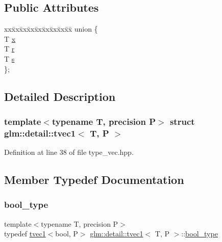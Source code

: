 \subsection*{Public Attributes}
\begin{DoxyCompactItemize}
\item 
\begin{tabbing}
xx\=xx\=xx\=xx\=xx\=xx\=xx\=xx\=xx\=\kill
union \{\\
\>T \hyperlink{structglm_1_1detail_1_1tvec1_a6d6f02bf4a9d0129762489169fc2f9dc}{x}\\
\>T \hyperlink{structglm_1_1detail_1_1tvec1_a23dd665bc4be83544c436a88fdcea088}{r}\\
\>T \hyperlink{structglm_1_1detail_1_1tvec1_a1025b03a3e1f99c7a42518af40737d7b}{s}\\
\}; \\

\end{tabbing}\end{DoxyCompactItemize}


\subsection{Detailed Description}
\subsubsection*{template$<$typename T, precision P$>$\newline
struct glm\+::detail\+::tvec1$<$ T, P $>$}



Definition at line 38 of file type\+\_\+vec.\+hpp.



\subsection{Member Typedef Documentation}
\mbox{\label{structglm_1_1detail_1_1tvec1_a9d5cbfb22c5b204382bede6efb1e96a2}} 
\subsubsection{\texorpdfstring{bool\+\_\+type}{bool\_type}}
{\footnotesize\ttfamily template$<$typename T, precision P$>$ \\
typedef \hyperlink{structglm_1_1detail_1_1tvec1}{tvec1}$<$bool, P$>$ \hyperlink{structglm_1_1detail_1_1tvec1}{glm\+::detail\+::tvec1}$<$ T, P $>$\+::\hyperlink{structglm_1_1detail_1_1tvec1_a9d5cbfb22c5b204382bede6efb1e96a2}{bool\+\_\+type}}




